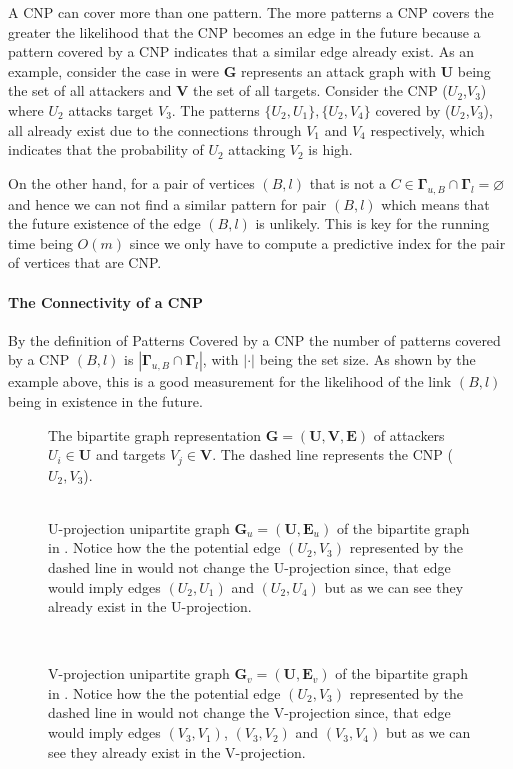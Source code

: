 A CNP can cover more than one pattern. The more patterns a CNP covers the greater the likelihood that the CNP becomes an edge in the future because a pattern covered by a CNP indicates that a similar edge already exist. As an example, consider the case in  were $\textbf{G}$ represents an attack graph with $\textbf{U}$ being the set of all attackers and $\textbf{V}$ the set of all targets. Consider the CNP ($U_2$,$V_3$) where $U_2$ attacks target $V_3$. The patterns $\{U_2,U_1\},\{U_2,V_4\}$ covered by ($U_2$,$V_3$), all already exist due to the connections through $V_1$ and $V_4$ respectively, which indicates that the probability of $U_2$ attacking $V_2$ is high.

On the other hand, for a pair of vertices $(B,l)$ that is not a $C\in\bm{\Gamma}_{u,B}\cap\bm{\Gamma}_{l} = \varnothing$ and hence we can not find a similar pattern for pair $(B,l)$ which means that the future existence of the edge $(B,l)$ is unlikely. This is key for the running time being $O(m)$ since we only have to compute a predictive index for the pair of vertices that are CNP.

\paragraph{The Connectivity of a CNP}
By the definition of Patterns Covered by a CNP the number of patterns covered by a CNP $(B,l)$ is $|\bm{\Gamma}_{u,B}\cap\bm{\Gamma}_{l}|$, with $|\cdot|$ being the set size. As shown by the example above, this is a good measurement for the likelihood of the link $(B,l)$ being in existence in the future.

\begin{figure}[!ht]
\centering

\caption{The bipartite graph representation $\textbf{G}=(\textbf{U},\textbf{V},\textbf{E})$ of attackers $U_i\in\textbf{U}$ and targets $V_j\in\textbf{V}$. The dashed line represents the CNP ($U_2,V_3$).\label{fig:cnp} }
~
\\[0.5cm]

\caption{U-projection unipartite graph  $\textbf{G}_u=(\textbf{U},\textbf{E}_u)$ of the bipartite graph in . Notice how the the potential edge $(U_2,V_3)$ represented by the dashed line in  would not change the U-projection since, that edge would imply edges $(U_2,U_1)$ and $(U_2,U_4)$ but as we can see they already exist in the U-projection.\label{fig:plp_u}}
~
\\[0.5cm]

\caption{V-projection unipartite graph $\textbf{G}_v=(\textbf{U},\textbf{E}_v)$ of the bipartite graph in .  Notice how the the potential edge $(U_2,V_3)$ represented by the dashed line in  would not change the V-projection since, that edge would imply edges $(V_3,V_1)$, $(V_3,V_2)$ and $(V_3,V_4)$ but as we can see they already exist in the V-projection.\label{fig:plp_v}}
\end{figure}

